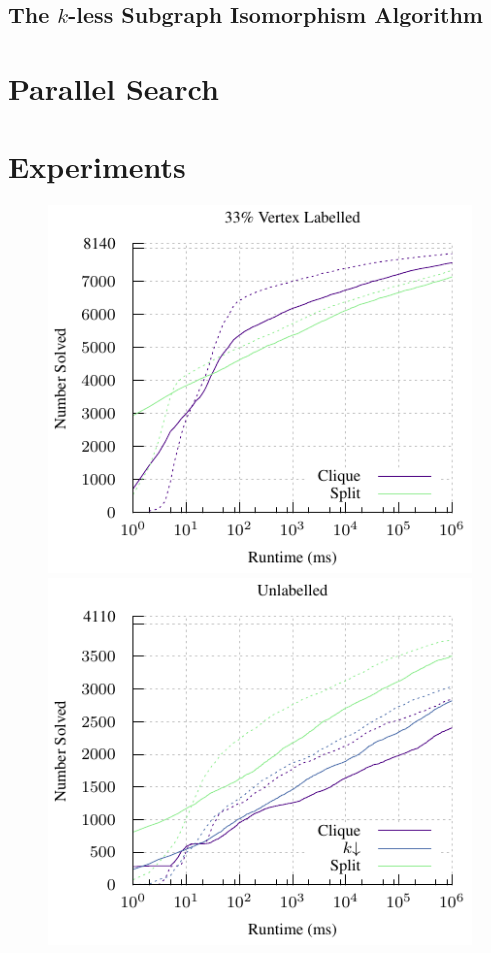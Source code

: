 \documentclass{llncs}
\begin{document}
\subsection{The $k$-less Subgraph Isomorphism Algorithm}

\section{Parallel Search}

\section{Experiments}

\begin{figure}[p]
    \includegraphics*[scale=0.7]{plots/33v-par-cumulative.pdf}
    \hfill
    \includegraphics*[scale=0.7]{plots/plain-par-cumulative.pdf}


\end{figure}
\end{document}

